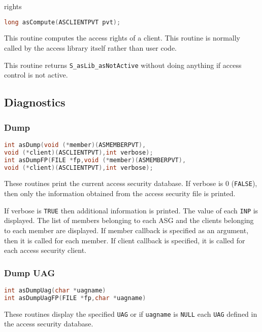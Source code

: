 rights

\begin{lstlisting}[language=C]
long asCompute(ASCLIENTPVT pvt); 
\end{lstlisting}

This routine computes the access rights of a client.
This routine is normally called by the access library itself rather than user code.

This routine returns \verb|S_asLib_asNotActive| without doing anything if access control is not active.

\subsection{Diagnostics}

\subsubsection{Dump}

\begin{lstlisting}[language=C]
int asDump(void (*member)(ASMEMBERPVT),
void (*client)(ASCLIENTPVT),int verbose);
int asDumpFP(FILE *fp,void (*member)(ASMEMBERPVT),
void (*client)(ASCLIENTPVT),int verbose);
\end{lstlisting}

These routines print the current access security database.
If verbose is 0 (\verb|FALSE|), then only the information obtained from the access security file is printed.

If verbose is \verb|TRUE| then additional information is printed.
The value of each \verb|INP| is displayed.
The list of members belonging to each ASG and the clients belonging to each member are displayed.
If member callback is specified as an argument, then it is called for each member.
If client callback is specified, it is called for each access security client.

\subsubsection{Dump UAG}

\begin{lstlisting}[language=C]
int asDumpUag(char *uagname)
int asDumpUagFP(FILE *fp,char *uagname)
\end{lstlisting}

These routines display the specified \verb|UAG| or if \verb|uagname| is \verb|NULL| each \verb|UAG| defined in the access security database.

